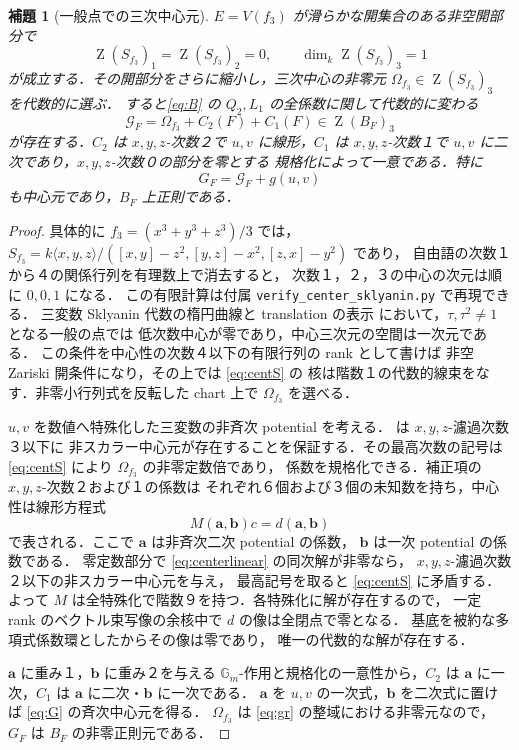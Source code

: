 \documentclass[11pt,a4paper]{ltjsarticle}
\numberwithin{equation}{section}
\newtheorem{lemma}[theorem]{補題}
\newcommand{\Z}{\operatorname{Z}}
\begin{document}
\begin{lemma}[一般点での三次中心元]\label{lem:center}
$E=V(f_3)$ が滑らかな開集合のある非空開部分で
\begin{equation}\label{eq:centS}
 \Z(S_{f_3})_1=\Z(S_{f_3})_2=0,\qquad
 \dim_k\Z(S_{f_3})_3=1
\end{equation}
が成立する．その開部分をさらに縮小し，三次中心の非零元
$\Omega_{f_3}\in\Z(S_{f_3})_3$ を代数的に選ぶ．
すると\eqref{eq:B} の $Q_2,L_1$ の全係数に関して代数的に変わる
\begin{equation}\label{eq:G}
 \mathcal G_F=\Omega_{f_3}+C_2(F)+C_1(F)\in\Z(B_F)_3
\end{equation}
が存在する．$C_2$ は $x,y,z$-次数２で $u,v$ に線形，$C_1$ は
$x,y,z$-次数１で $u,v$ に二次であり，$x,y,z$-次数０の部分を零とする
規格化によって一意である．特に
\begin{equation}\label{eq:Gg}
 G_F=\mathcal G_F+g(u,v)
\end{equation}
も中心元であり，$B_F$ 上正則である．
\end{lemma}
\begin{proof}
具体的に $f_3=(x^3+y^3+z^3)/3$ では，
$S_{f_3}=k\langle x,y,z\rangle/([x,y]-z^2,[y,z]-x^2,[z,x]-y^2)$ であり，
自由語の次数１から４の関係行列を有理数上で消去すると，
次数１，２，３の中心の次元は順に $0,0,1$ になる．
この有限計算は付属 \texttt{verify\_center\_sklyanin.py} で再現できる．
三変数 Sklyanin 代数の楕円曲線と translation の表示
\cite{ATV,EG} において，$\tau,\tau^2\ne1$ となる一般の点では
低次数中心が零であり，中心三次元の空間は一次元である．
この条件を中心性の次数４以下の有限行列の rank として書けば
非空 Zariski 開条件になり，その上では \eqref{eq:centS} の
核は階数１の代数的線束をなす．非零小行列式を反転した
chart 上で $\Omega_{f_3}$ を選べる．

$u,v$ を数値へ特殊化した三変数の非斉次 potential を考える．
\cite[Theorem~3.3.2(ii)]{EG} は $x,y,z$-濾過次数３以下に
非スカラー中心元が存在することを保証する．その最高次数の記号は
\eqref{eq:centS} により $\Omega_{f_3}$ の非零定数倍であり，
係数を規格化できる．補正項の $x,y,z$-次数２および１の係数は
それぞれ６個および３個の未知数を持ち，中心性は線形方程式
\begin{equation}\label{eq:centerlinear}
 M(\mathbf a,\mathbf b)c=d(\mathbf a,\mathbf b)
\end{equation}
で表される．ここで $\mathbf a$ は非斉次二次 potential の係数，
$\mathbf b$ は一次 potential の係数である．
零定数部分で \eqref{eq:centerlinear} の同次解が非零なら，
$x,y,z$-濾過次数２以下の非スカラー中心元を与え，
最高記号を取ると \eqref{eq:centS} に矛盾する．
よって $M$ は全特殊化で階数９を持つ．各特殊化に解が存在するので，
一定 rank のベクトル束写像の余核中で $d$ の像は全閉点で零となる．
基底を被約な多項式係数環としたからその像は零であり，
唯一の代数的な解が存在する．

$\mathbf a$ に重み１，$\mathbf b$ に重み２を与える
$\mathbb G_m$-作用と規格化の一意性から，$C_2$ は
$\mathbf a$ に一次，$C_1$ は $\mathbf a$ に二次・$\mathbf b$ に一次である．
$\mathbf a$ を $u,v$ の一次式，$\mathbf b$ を二次式に置けば
\eqref{eq:G} の斉次中心元を得る．
$\Omega_{f_3}$ は \eqref{eq:gr} の整域における非零元なので，
$G_F$ は $B_F$ の非零正則元である．
\end{proof}
\end{document}
